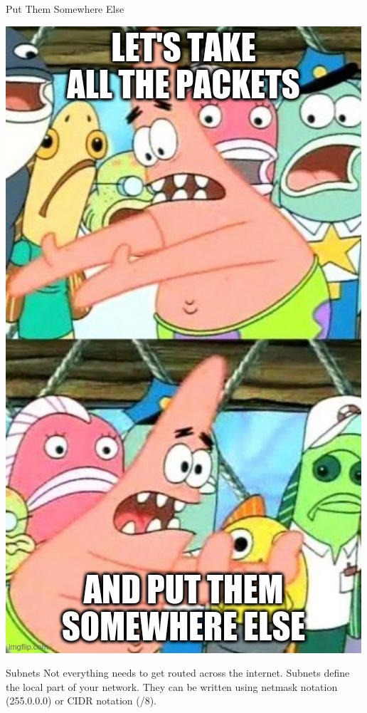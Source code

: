 \documentclass[presentation]{beamer}
\begin{document}
\begin{frame}[label={sec:orgb0760c1}]{Put Them Somewhere Else}
\begin{center}
\includegraphics[height=0.8\textheight]{./somewhere-else.jpg}
\end{center}
\end{frame}

\begin{frame}[label={sec:org55247f7}]{Subnets}
Not everything needs to get routed across the internet.  Subnets
define the local part of your network. They can be written using
netmask notation (255.0.0.0) or CIDR notation (/8).
\end{frame}
\end{document}
